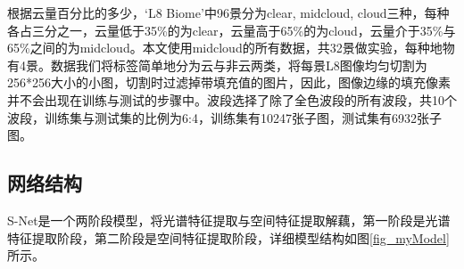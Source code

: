 \documentclass[10pt]{ctexart}
\begin{document}
\begin{multicols}{2}
\begin{table}[H]
    \centering
    
    \label{BiomeFlag}
    \end{table}

根据云量百分比的多少，‘L8 Biome’中96景分为clear, midcloud, cloud三种，每种各占三分之一，云量低于35\%的为clear，云量高于65\%的为cloud，云量介于35\%与65\%之间的为midcloud。本文使用midcloud的所有数据，共32景做实验，每种地物有4景。数据我们将标签简单地分为云与非云两类，将每景L8图像均匀切割为256*256大小的小图，切割时过滤掉带填充值的图片，因此，图像边缘的填充像素并不会出现在训练与测试的步骤中。波段选择了除了全色波段的所有波段，共10个波段，训练集与测试集的比例为6:4，训练集有10247张子图，测试集有6932张子图。

\subsection{网络结构}

S-Net是一个两阶段模型，将光谱特征提取与空间特征提取解藕，第一阶段是光谱特征提取阶段，第二阶段是空间特征提取阶段，详细模型结构如图\ref{fig_myModel}所示。
\end{multicols}
\end{document}
